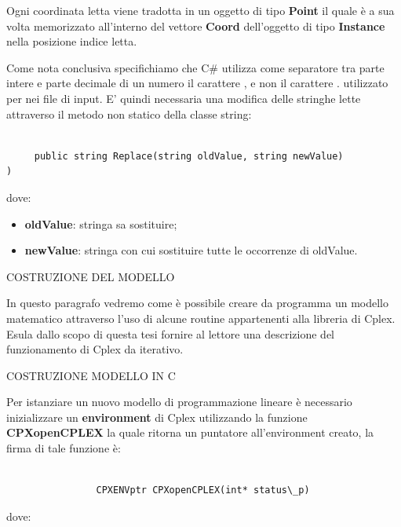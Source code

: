 \documentclass[11pt]{article}
\begin{document}
Ogni coordinata letta viene tradotta in un oggetto di tipo \textbf{Point} il quale è a sua volta memorizzato all'interno del vettore \textbf{Coord} dell'oggetto di tipo \textbf{Instance} nella posizione indice letta.

Come nota conclusiva specifichiamo che C\# utilizza come separatore tra parte intere e parte decimale di un numero il carattere , e non il carattere . utilizzato per nei file di input. E' quindi necessaria una modifica delle stringhe lette attraverso il metodo non statico della classe string:

\begin{lstlisting}

     public string Replace(string oldValue, string newValue)
)

\end{lstlisting}
dove:
\begin{itemize}
    \item \textbf{oldValue}: stringa sa sostituire;
    \item \textbf{newValue}: stringa con cui sostituire tutte le occorrenze di oldValue.
\end{itemize}

\vspace{2\baselineskip}
COSTRUZIONE DEL MODELLO
\vspace{2\baselineskip}

In questo paragrafo vedremo come è possibile creare da programma un modello matematico attraverso l'uso di alcune routine appartenenti alla libreria di Cplex. Esula dallo scopo di questa tesi fornire al lettore una descrizione del funzionamento di Cplex da iterativo.


\vspace{2\baselineskip}
COSTRUZIONE MODELLO IN C
\vspace{2\baselineskip}

Per istanziare un nuovo modello di programmazione lineare è necessario inizializzare un \textbf{environment} di Cplex utilizzando la funzione \textbf{CPXopenCPLEX} la quale ritorna un puntatore all'environment creato, la firma di tale funzione è:


\begin{lstlisting}

                CPXENVptr CPXopenCPLEX(int* status\_p)

\end{lstlisting}

dove:
\end{document}
